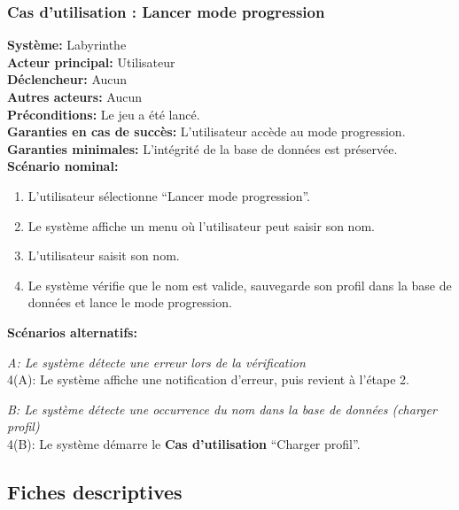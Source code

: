 \documentclass{butexFR}
\begin{document}
\newpage

\subsubsection{Cas d'utilisation : Lancer mode progression}
\textbf{Système:} Labyrinthe\\
\textbf{Acteur principal:} Utilisateur\\
\textbf{Déclencheur:} Aucun\\
\textbf{Autres acteurs:} Aucun\\
\textbf{Préconditions:} Le jeu a été lancé.\\
\textbf{Garanties en cas de succès:} L'utilisateur accède au mode progression.\\
\textbf{Garanties minimales:} L'intégrité de la base de données est préservée.\\
\textbf{Scénario nominal:}
\begin{enumerate}
    \item L'utilisateur sélectionne ``Lancer mode progression''.
    \item Le système affiche un menu où l'utilisateur peut saisir son nom.
    \item L'utilisateur saisit son nom.
    \item Le système vérifie que le nom est valide, sauvegarde son profil dans la base de données et lance le mode progression.
\end{enumerate}
\textbf{Scénarios alternatifs:}

\emph{A: Le système détecte une erreur lors de la vérification}\\
\hspace*{1em}4(A): Le système affiche une notification d'erreur, puis revient à l'étape 2.

\emph{B: Le système détecte une occurrence du nom dans la base de données (charger profil)}\\
\hspace*{1em}4(B): Le système démarre le \textbf{Cas d'utilisation} ``Charger profil''.

\newpage

\subsection{Fiches descriptives}
\end{document}
